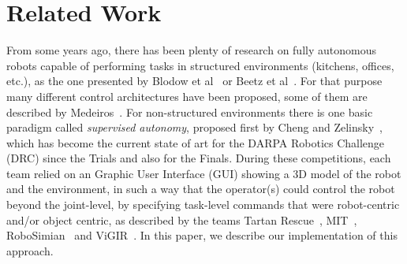 \section{Related Work}
	\label{sec:related_work}
	
	From some years ago, there has been plenty of research on fully autonomous robots capable of performing
	tasks in structured environments (kitchens, offices, etc.), as the one presented by Blodow et al~\cite{Blodow}
	or Beetz et al~\cite{Beetz}.
	For that purpose many different control architectures have been proposed, some of them are described by
	Medeiros~\cite{Medeiros}.
	For non-structured environments there is one basic paradigm called \emph{supervised autonomy},
	proposed first by Cheng and Zelinsky~\cite{Cheng}, which has become the current state of art for
	the DARPA Robotics Challenge (DRC) since the Trials and also for the Finals.
	During these competitions, each team relied on an Graphic User Interface (GUI) showing a 3D model of the
	robot and the environment, in such a way that the operator(s) could control the robot beyond the joint-level,
	by specifying task-level commands that were robot-centric and/or object centric, as described by the teams
	Tartan Rescue~\cite{Dellin}, MIT~\cite{Fallon}, RoboSimian~\cite{Hebert} and ViGIR~\cite{Romay}.
	In this paper, we describe our implementation of this approach.